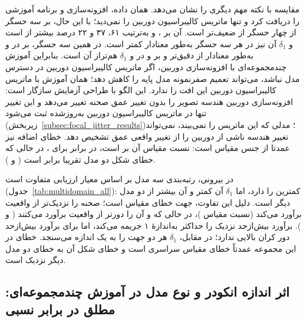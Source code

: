 مقایسه \controlmodel{} با \publishedbasemodel{} نکته مهم دیگری را نشان می‌دهد. \controlmodel{} همان داده، افزونه‌سازی و برنامه آموزشی \proposedmodel{} را دریافت کرد و تنها ماتریس کالیبراسیون دوربین را نمی‌دید؛ با این حال، بر سه حسگر از چهار حسگر  از \publishedbasemodel{} ضعیف‌تر است.  آن بر ،  و  به‌ترتیب ۶۱، ۳۷ و ۲۲ درصد بیشتر از \publishedbasemodel{} است و $\delta_1$ آن نیز در هر سه حسگر به‌طور معنادار کمتر است. در همین سه حسگر، \proposedmodel{} بر  در  و  به‌طور معنادار از \publishedbasemodel{} دقیق‌تر و بر  و  در  و $\delta_1$ هم‌تراز آن است. بنابراین آموزش چندمجموعه‌ای با افزونه‌سازی دوربین، اگر ماتریس کالیبراسیون دوربین در دسترس مدل نباشد، می‌تواند تعمیم صفرنمونه مدل پایه را کاهش دهد؛ همان آموزش با ماتریس کالیبراسیون دوربین این افت را ندارد. این الگو با طراحی آزمایش سازگار است: افزونه‌سازی دوربین هندسه تصویر را بدون تغییر عمق صحنه تغییر می‌دهد و این تغییر تنها در ماتریس کالیبراسیون دوربین به‌روزشده ثبت می‌شود (زیربخش~\ref{subsec:focal_jitter_results})؛ مدلی که این ماتریس را نمی‌بیند، نمی‌تواند تغییر هندسه ناشی از دوربین را از تغییر واقعی عمق تشخیص دهد. خطای اضافه \controlmodel{} نیز عمدتا از جنس مقیاس است: نسبت مقیاس آن بر   است، در برابر  برای \proposedmodel{}، در حالی که خطای شکل دو مدل تقریبا برابر است ( و ).

در  بیرونی، رتبه‌بندی سه مدل بر اساس معیار ارزیابی متفاوت است (جدول~\ref{tab:multidomain_all}): \proposedmodel{} کمترین  را دارد، اما $\delta_1$ آن کمتر و  آن بیشتر از دو مدل دیگر است. دلیل این تفاوت، جهت خطای مقیاس است؛ \proposedmodel{} صحنه را نزدیک‌تر از واقعیت برآورد می‌کند (نسبت مقیاس )، در حالی که \controlmodel{} و \publishedbasemodel{} آن را دورتر از واقعیت برآورد می‌کنند ( و ).  برآورد بیش‌ازحد نزدیک را حداکثر به‌اندازهٔ ۱ جریمه می‌کند، اما برای برآورد بیش‌ازحد دور کران بالایی ندارد؛ در مقابل، $\delta_1$ هر دو جهت را به یک اندازه می‌سنجد. خطای \proposedmodel{} در این مجموعه عمدتاً خطای مقیاس سراسری است و خطای شکل آن به خطای دو مدل دیگر نزدیک است.

\subsection[اثر اندازه انکودر و نوع مدل در آموزش چندمجموعه‌ای: مطلق در برابر نسبی]{اثر اندازه انکودر و نوع مدل در آموزش چندمجموعه‌ای: مطلق در برابر نسبی}
\label{subsec:revised_cross_dataset}

